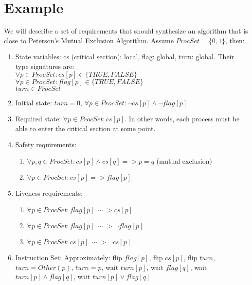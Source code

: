 \documentclass[12pt]{article}
\begin{document}
\section{Example}
We will describe a set of requirements that should synthesize an algorithm that is close to Peterson's Mutual Exclusion Algorithm.  Assume $ProcSet = \{0,1\}$, then:
	\begin{enumerate}
		\item State variables: cs (critical section): local, flag: global, turn: global.  Their type signatures are: \\
				$\forall p \in ProcSet : cs[p] \in \{TRUE,FALSE\}$ \\
				$\forall p \in ProcSet : flag[p] \in \{TRUE,FALSE\}$ \\
				$turn \in ProcSet$
		\item Initial state: $turn = 0$, $\forall p \in ProcSet: \lnot cs[p] \wedge \lnot flag[p]$
		\item Required state: $\forall p \in ProcSet : cs[p]$.  In other words, each process must be able to enter the critical section at some point.  
		\item Safety requirements:
			\begin{enumerate}
				\item $\forall p,q \in ProcSet : cs[p] \wedge cs[q] => p = q$ (mutual exclusion)
				\item $\forall p \in ProcSet : cs[p] => flag[p]$
			\end{enumerate}
		\item Liveness requirements:
			\begin{enumerate}
				\item $\forall p \in ProcSet : flag[p] ~\sim> cs[p]$
				\item $\forall p \in ProcSet : flag[p] ~\sim> \lnot flag[p]$
				\item $\forall p \in ProcSet : cs[p] ~\sim> \lnot cs[p]$
			\end{enumerate}
		\item Instruction Set: Approximately: flip $flag[p]$, flip $cs[p]$, flip $turn$, $turn = Other(p)$, $turn = p$, wait $turn[p]$, wait $flag[q]$, wait $turn[p] \wedge flag[q]$, wait $turn[p] \vee flag[q]$
	\end{enumerate}
\end{document}
